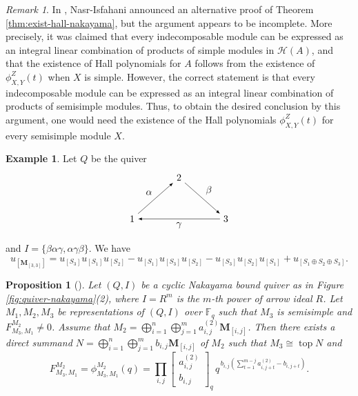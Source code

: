 \documentclass[12pt]{amsart}
\newtheorem{proposition}[theorem]{Proposition}
\theoremstyle{remark}
\newtheorem{remark}[theorem]{Remark}
\theoremstyle{definition}
\newtheorem{example}[theorem]{Example}
\numberwithin{equation}{section}
\begin{document}
\begin{remark}
  In \cite{NI12}, Nasr-Isfahani announced an alternative proof of Theorem \ref{thm:exist-hall-nakayama}, but the argument appears to be incomplete. More precisely, it was claimed that every indecomposable module can be expressed as an integral linear combination of products of simple modules in $\mathcal{H}(A)$, and that the existence of Hall polynomials for $A$ follows from the existence of $\phi_{X,Y}^Z(t)$ when $X$ is simple. However, the correct statement is that every indecomposable module can be expressed as an integral linear combination of products of semisimple modules. Thus, to obtain the desired conclusion by this argument, one would need the existence of the Hall polynomials $\phi_{X,Y}^Z(t)$ for every semisimple module $X$.
\end{remark}
\begin{example}
   Let $Q$ be the quiver 
\[
\begin{tikzpicture}[>=latex]
\node (1) at (0,0) {$1$};
\node (2) at (1.7,1.5) {$2$};
\node (3) at (3.4,0) {$3$};

\draw[->] (1) -- node[above left] {$\alpha$} (2);
\draw[->] (2) -- node[above right] {$\beta$} (3);
\draw[->] (3) -- node[below] {$\gamma$} (1);
\end{tikzpicture}
\]
and $I=\{\beta\alpha\gamma, \alpha\gamma\beta\}$. We have
\[
    u_{[\mathbf{M}_{[3,3]}]}=u_{[S_3]}u_{[S_1]}u_{[S_2]}-u_{[S_1]}u_{[S_3]}u_{[S_2]}-u_{[S_3]}u_{[S_2]}u_{[S_1]}+u_{[S_1\oplus S_2 \oplus S_3]}.
\]
\end{example}


\begin{proposition}[{\cite[Proposition 3.4]{G95}}]\label{pro:semi-hall-number-k}
Let $(Q,I)$ be a cyclic Nakayama bound quiver as in Figure \ref{fig:quiver-nakayama}(2), where $I=R^m$ is the $m$-th power of arrow ideal $R$.
Let $M_1,M_2,M_3$ be representations of $(Q,I)$ over $\mathbb{F}_q$ such that $M_3$ is semisimple and $F_{M_3,M_1}^{M_2}\neq 0$. Assume that   $M_2=\bigoplus_{i=1}^{n} \bigoplus_{j=1}^{m}a_{i,j}^{(2)}\mathbf{M}_{[i,j]}$.
Then there exists a direct summand $N=\bigoplus_{i=1}^n\bigoplus_{j=1}^mb_{i,j}\mathbf{M}_{[i,j]}$ of $M_2$ such that $M_3\cong \operatorname{top} N$ and
\[
F_{M_3,M_1}^{M_2}
=\phi_{M_3,M_1}^{M_2}(q)=
\prod_{i,j}
\begin{bmatrix}
a_{i,j}^{(2)}\\
b_{i,j}
\end{bmatrix}_q
\,q^{\,b_{i,j}\left(\sum_{t=1}^{m-j} a_{i,j+t}^{(2)}-b_{i,j+t}\right)}.
\]

\end{proposition}
\end{document}
